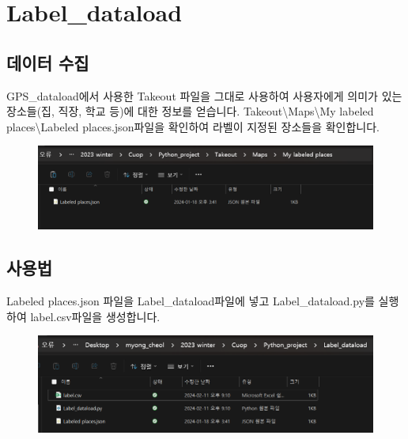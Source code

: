 \documentclass{oblivoir}
\begin{document}
  \chapter{Label\_dataload}
  \setcounter{section}{0}
  \section{데이터 수집}
  GPS\_dataload에서 사용한 Takeout 파일을 그대로 사용하여 사용자에게 의미가 있는 장소들(집, 직장, 학교 등)에 대한 정보를 얻습니다.
  Takeout\textbackslash Maps\textbackslash My labeled places\textbackslash Labeled places.json파일을 확인하여 라벨이 지정된 장소들을 확인합니다.
  \begin{figure}[H]
    \includegraphics[width=\textwidth]{Label_dataload_1.png}
  \end{figure}
  \section{사용법}
  Labeled places.json 파일을 Label\_dataload파일에 넣고 Label\_dataload.py를 실행하여 label.csv파일을 생성합니다.
  \begin{figure}[H]
    \includegraphics[width=\textwidth]{Label_dataload_2.png}
  \end{figure}
\end{document}

